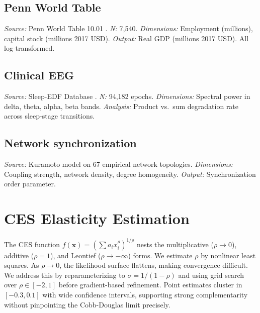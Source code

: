 \documentclass[12pt, a4paper]{article}
\theoremstyle{definition}
\theoremstyle{remark}
\begin{document}
\subsection{Penn World Table}
\textit{Source:} Penn World Table 10.01 \cite{feenstra2015}. \textit{N:} 7,540. \textit{Dimensions:} Employment (millions), capital stock (millions 2017 USD). \textit{Output:} Real GDP (millions 2017 USD). All log-transformed.

\subsection{Clinical EEG}
\textit{Source:} Sleep-EDF Database \cite{goldberger2000}. \textit{N:} 94,182 epochs. \textit{Dimensions:} Spectral power in delta, theta, alpha, beta bands. \textit{Analysis:} Product vs.\ sum degradation rate across sleep-stage transitions.

\subsection{Network synchronization}
\textit{Source:} Kuramoto model on 67 empirical network topologies. \textit{Dimensions:} Coupling strength, network density, degree homogeneity. \textit{Output:} Synchronization order parameter.


\section{CES Elasticity Estimation}\label{app:ces}

The CES function $f(\mathbf{x}) = \left(\sum a_i x_i^\rho\right)^{1/\rho}$ nests the multiplicative ($\rho \to 0$), additive ($\rho = 1$), and Leontief ($\rho \to -\infty$) forms. We estimate $\rho$ by nonlinear least squares. As $\rho \to 0$, the likelihood surface flattens, making convergence difficult. We address this by reparameterizing to $\sigma = 1/(1-\rho)$ and using grid search over $\rho \in [-2, 1]$ before gradient-based refinement. Point estimates cluster in $[-0.3, 0.1]$ with wide confidence intervals, supporting strong complementarity without pinpointing the Cobb-Douglas limit precisely.
\end{document}

